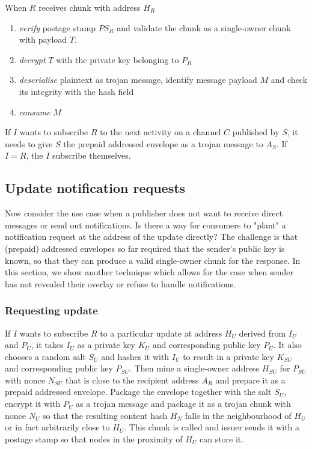 When $R$ receives chunk with address $H_R$

\begin{enumerate}
\item \emph{verify} postage stamp $PS_R$ and validate the chunk as a single-owner chunk with payload $T$.
\item \emph{decrypt} $T$ with the private key belonging to $P_R$
\item \emph{deserialise} plaintext as trojan message, identify message payload $M$ and check its integrity with the hash field
\item \emph{consume} $M$
\end{enumerate}

If $I$ wants to subscribe $R$ to the next activity on a channel $C$ published by $S$, it needs to give $S$ the prepaid addressed envelope as a trojan message to $A_S$.
If $I=R$, the $I$ subscribe themselves.

\subsection{Update notification requests\statusgreen}\label{sec:update-notification-requests} 

Now consider the use case when a publisher does not want to receive direct messages or send out notifications. Is there a way for consumers to "plant" a notification request at the address of the update directly? The challenge is that (prepaid) addressed envelopes so far required that the sender's public key is known, so that they can produce a valid single-owner chunk for the response. In this section, we show another technique which allows for the case when sender has not revealed their overlay or refuse to handle notifications.                                                                                                                                                                                                                               
\subsubsection{Requesting update} 

If $I$  wants to subscribe $R$ to a  particular update at address $H_U$ derived from $I_U$ and $P_U$, it takes $I_U$ as a private key $K_U$ and corresponding public key $P_U$. It also chooses a random salt $S_U$ and hashes it with $I_U$ to result in a private key $K_{SU}$ and corresponding public key $P_{SU}$. Then mine a single-owner address $H_{SU}$ for $P_{SU}$ with nonce $N_{SU}$ that is close to the recipient address $A_R$ and prepare it as a prepaid addressed envelope. Package the envelope together with the salt $S_U$, encrypt it with $P_U$ as a trojan message and
package it as a trojan chunk with nonce $N_U$ so that the resulting content hash $H_N$ falls in the neighbourhood of $H_U$ or in fact arbitrarily close to $H_U$. This chunk is called  and issuer sends it with a postage stamp so that nodes in the proximity of $H_U$ can store it.



